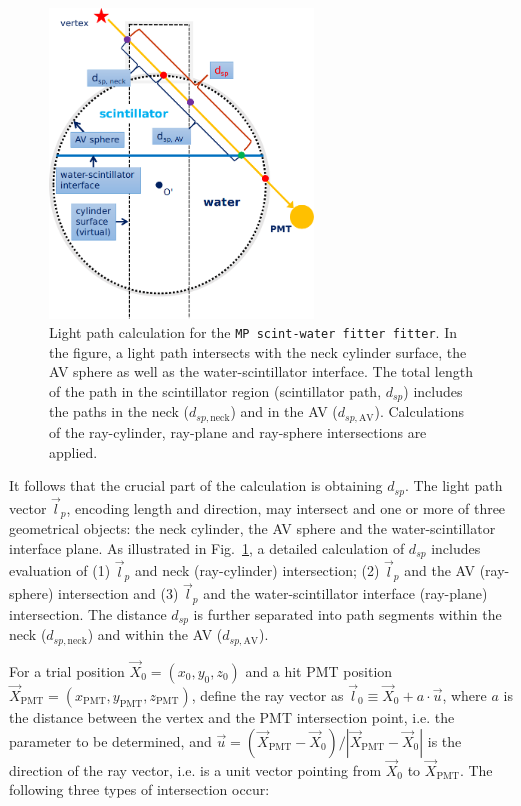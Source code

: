 \begin{figure}[!htb]
	\centering
	\includegraphics[width=7cm]{scintpath.png}
	\caption[Light path calculation for the \texttt{MP scint-water fitter fitter}.]{Light path calculation for the \texttt{MP scint-water fitter fitter}. In the figure, a light path intersects with the neck cylinder surface, the AV sphere as well as the water-scintillator interface. The total length of the path in the scintillator region (scintillator path, $d_{sp}$) includes the paths in the neck ($d_{sp,\mathrm{neck}}$) and in the AV ($d_{sp,\mathrm{AV}}$). Calculations of the ray-cylinder, ray-plane and ray-sphere intersections are applied.	\label{fig:scintpath}}
\end{figure}

It follows that the crucial part of the calculation is obtaining $d_{sp}$. The light path vector $\vec{l}_p$, encoding length and direction, may intersect and one or more of three geometrical objects: the neck cylinder, the AV sphere and the water-scintillator interface plane. As illustrated in Fig.~\ref{fig:scintpath}, a detailed calculation of $d_{sp}$ includes evaluation of (1) $\vec{l}_p$ and neck (ray-cylinder) intersection; (2) $\vec{l}_p$ and the AV (ray-sphere) intersection and (3) $\vec{l}_p$ and the water-scintillator interface (ray-plane) intersection. The distance $d_{sp}$ is further separated into path segments within the neck ($d_{sp,\mathrm{neck}}$) and within the AV ($d_{sp,\mathrm{AV}}$). 

For a trial position $\vec{X}_0=(x_0,y_0,z_0)$ and a hit PMT position $\vec{X}_{\mathrm{PMT}}=(x_\mathrm{PMT},y_\mathrm{PMT},z_\mathrm{PMT})$, define the ray vector as $\vec{l}_0\equiv\vec{X}_0+a\cdot \vec{u}$, where $a$ is the distance between the vertex and the PMT intersection point, i.e. the parameter to be determined, and $\vec u=(\vec{X}_{\mathrm{PMT}}-\vec{X}_0 ) / |\vec{X}_{\mathrm{PMT}}-\vec{X}_0|$ is the direction of the ray vector, i.e. is a unit vector pointing from $\vec{X}_0$ to $\vec{X}_{\mathrm{PMT}}$. The following three types of intersection occur:

